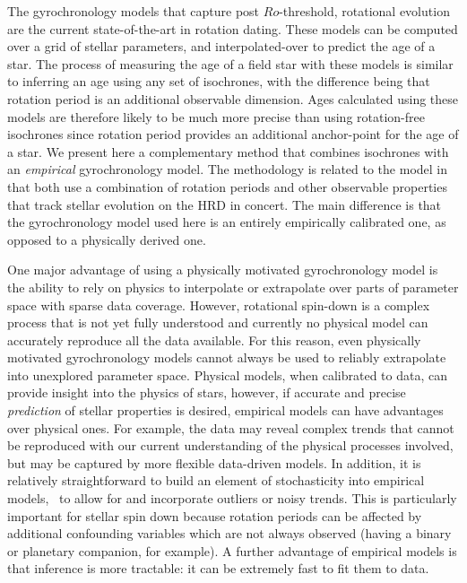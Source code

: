 The gyrochronology models that capture post $Ro$-threshold, rotational
evolution \citep{vansaders2016} are the current state-of-the-art in rotation
dating.
These models can be computed over a grid of stellar parameters, and
interpolated-over to predict the age of a star.
The process of measuring the age of a field star with these models is similar
to inferring an age using any set of isochrones, with the difference being
that rotation period is an additional observable dimension.
Ages calculated using these models are therefore likely to be much more
precise than using rotation-free isochrones since rotation period provides an
additional anchor-point for the age of a star.
We present here a complementary method that combines isochrones with an {\it
empirical} gyrochronology model.
The methodology is related to the \citet{vansaders2016} model in that both use
a combination of rotation periods and other observable properties that track
stellar evolution on the HRD in concert.
The main difference is that the gyrochronology model used here is an entirely
empirically calibrated one, as opposed to a physically derived one.

One major advantage of using a physically motivated gyrochronology model is
the ability to rely on physics to interpolate or extrapolate over parts of
parameter space with sparse data coverage.
However, rotational spin-down is a complex process that is not yet fully
understood and currently no physical model can accurately reproduce all the
data available.
For this reason, even physically motivated gyrochronology models cannot always
be used to reliably extrapolate into unexplored parameter space.
Physical models, when calibrated to data, can provide insight into the physics
of stars, however, if accurate and precise {\it prediction} of stellar
properties is desired, empirical models can have advantages over physical
ones.
For example, the data may reveal complex trends that cannot be reproduced with
our current understanding of the physical processes involved, but may be
captured by more flexible data-driven models.
In addition, it is relatively straightforward to build an element of
stochasticity into empirical models, \ie\ to allow for and incorporate
outliers or noisy trends.
This is particularly important for stellar spin down because rotation periods
can be affected by additional confounding variables which are not always
observed (having a binary or planetary companion, for example).
A further advantage of empirical models is that inference is more tractable:
it can be extremely fast to fit them to data.

